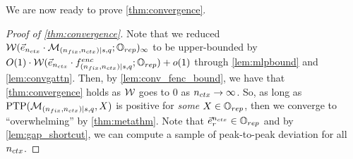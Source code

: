 We are now ready to prove \cref{thm:convergence}.
\begin{proof}[Proof of \cref{thm:convergence}]
	Note that we reduced $\mathcal{W}(\vec{e}_{n_{ctx}} \cdot \mathcal{M}_{(n_{fix}, {n_{ctx}}) \mid {s}, q}; \mathbb{O}_{rep})_\infty$ to be upper-bounded by 
	$
	O(1) \cdot \mathcal{W}(\vec{e}_{n_{ctx}} \cdot f^{enc}_{(n_{fix}, {n_{ctx}}) \mid {s}, q}; \mathbb{O}_{rep}) + o(1)
	$
	through \cref{lem:mlpbound} and \cref{lem:convgattn}.
	Then, by \cref{lem:conv_fenc_bound}, we have that \cref{thm:convergence} holds as $\mathcal{W}$ goes to $0$ as ${n_{ctx}} \rightarrow \infty$.
    So, as long as $\mathrm{PTP}(\mathcal{M}_{(n_{fix}, {n_{ctx}}) \mid {s}, q}, X)$ is positive for \emph{some} $X \in \mathbb{O}_{rep}$, then we converge to ``overwhelming'' by \cref{thm:metathm}.
    Note that $\vec{e}_r^{n_{ctx}} \in \mathbb{O}_{rep}$ and by \cref{lem:gap_shortcut}, we can compute a sample of peak-to-peak deviation for all ${n_{ctx}}$.
\end{proof}




